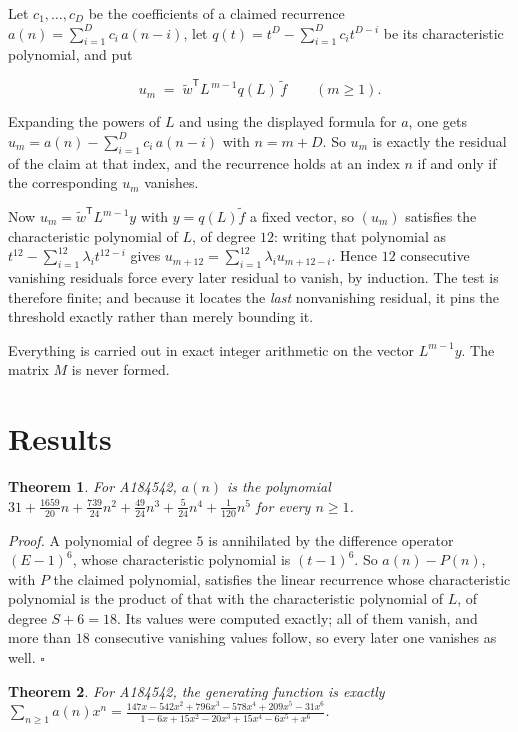 \documentclass[11pt]{article}
\newtheorem{theorem}{Theorem}
\theoremstyle{definition}
\begin{document}
Let $c_1,\dots,c_D$ be the coefficients of a claimed recurrence $a(n) = \sum_{i=1}^{D} c_i\,a(n-i)$, let $q(t) = t^{D} - \sum_{i=1}^{D} c_i t^{D-i}$ be its characteristic polynomial, and put

\[u_m \;=\; \tilde w^{\mathsf T} L^{\,m-1} q(L)\,\tilde f \qquad (m \ge 1).\]

Expanding the powers of $L$ and using the displayed formula for $a$, one gets $u_m = a(n) - \sum_{i=1}^{D} c_i\,a(n-i)$ with $n = m + D$. So $u_m$ is exactly the residual of the claim at that index, and the recurrence holds at an index $n$ if and only if the corresponding $u_m$ vanishes.

Now $u_m = \tilde w^{\mathsf T} L^{m-1} y$ with $y = q(L)\tilde f$ a fixed vector, so $(u_m)$ satisfies the characteristic polynomial of $L$, of degree $12$: writing that polynomial as $t^{12} - \sum_{i=1}^{12} \lambda_i t^{12-i}$ gives $u_{m+12} = \sum_{i=1}^{12} \lambda_i u_{m+12-i}$. Hence $12$ consecutive vanishing residuals force every later residual to vanish, by induction. The test is therefore finite; and because it locates the {\itshape last} nonvanishing residual, it pins the threshold exactly rather than merely bounding it.

Everything is carried out in exact integer arithmetic on the vector $L^{m-1}y$. The matrix $M$ is never formed.

\section{Results}

\begin{theorem} For A184542, $a(n)$ is the polynomial $31 + \frac{1659}{20}n + \frac{739}{24}n^{2} + \frac{49}{24}n^{3} + \frac{5}{24}n^{4} + \frac{1}{120}n^{5}$ for every $n \ge 1$.\end{theorem}

{\itshape Proof.} A polynomial of degree $5$ is annihilated by the difference operator $(E-1)^{6}$, whose characteristic polynomial is $(t-1)^{6}$. So $a(n) - P(n)$, with $P$ the claimed polynomial, satisfies the linear recurrence whose characteristic polynomial is the product of that with the characteristic polynomial of $L$, of degree $S + 6 = 18$. Its values were computed exactly; all of them vanish, and more than $18$ consecutive vanishing values follow, so every later one vanishes as well. $\square$

\begin{theorem} For A184542, the generating function is exactly $\sum_{n\ge 1} a(n)x^n = \frac{147x - 542x^{2} + 796x^{3} - 578x^{4} + 209x^{5} - 31x^{6}}{1 - 6x + 15x^{2} - 20x^{3} + 15x^{4} - 6x^{5} + x^{6}}$.\end{theorem}
\end{document}
